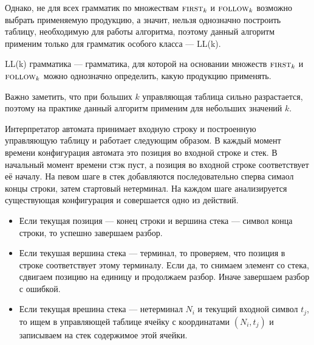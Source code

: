 Однако, не для всех грамматик по множествам $\first[k]$ и $\follow[k]$ возможно выбрать применяемую продукцию, а значит, нельзя однозначно построить таблицу, необходимую для работы алгоритма, поэтому данный алгоритм применим только для грамматик особого класса --- LL(k).

\begin{definition}
  LL(k) грамматика --- грамматика, для которой на основании множеств $\first[k]$ и $\follow[k]$ можно однозначно определить, какую продукцию применять.
\end{definition}

Важно заметить, что при больших $k$ управляющая таблица сильно разрастается, поэтому на практике данный алгоритм применим для небольших значений $k$.

Интерпретатор автомата принимает входную строку и построенную управляющую таблицу и работает следующим образом.
В каждый момент времени конфигурация автомата это позиция во входной строке и стек.
В начальный момент времени стэк пуст, а позиция во входной строке соответствует её началу.
На певом шаге в стек добавляются последовательно сперва симаол концы строки, затем стартовый нетерминал.
На каждом шаге анализируется существующая конфигурация и совершается одно из действий.
\begin{itemize}
\item Если текущая позиция --- конец строки и вершина стека --- символ конца строки, то успешно завершаем разбор.
\item Если текушая вершина стека --- терминал, то проверяем, что позиция в строке соответствует этому терминалу. Если да, то снимаем элемент со стека, сдвигаем позицию на единицу и продолжаем разбор. Иначе завершаем разбор с ошибкой.
\item Если текущая врешина стека --- нетерминал $N_i$ и текущий входной символ $t_j$, то ищем в управляющей таблице ячейку с координатами $(N_i, t_j)$ и записываем на стек содержимое этой ячейки.
\end{itemize}

